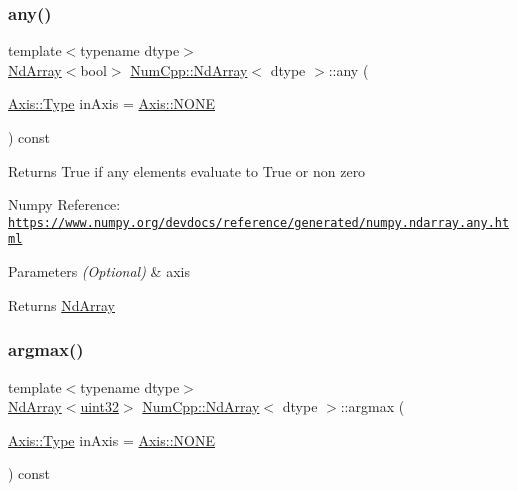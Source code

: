 \subsubsection{\texorpdfstring{any()}{any()}}
{\footnotesize\ttfamily template$<$typename dtype$>$ \\
\mbox{\hyperlink{class_num_cpp_1_1_nd_array}{Nd\+Array}}$<$bool$>$ \mbox{\hyperlink{class_num_cpp_1_1_nd_array}{Num\+Cpp\+::\+Nd\+Array}}$<$ dtype $>$\+::any (\begin{DoxyParamCaption}\item[{\mbox{\hyperlink{struct_num_cpp_1_1_axis_ac10eb76f8631762d9ed70c40c42ca6cb}{Axis\+::\+Type}}}]{in\+Axis = {\ttfamily \mbox{\hyperlink{struct_num_cpp_1_1_axis_ac10eb76f8631762d9ed70c40c42ca6cba747ae657022cca1d87702b56d0c038e9}{Axis\+::\+N\+O\+NE}}} }\end{DoxyParamCaption}) const\hspace{0.3cm}{\ttfamily [inline]}}

Returns True if any elements evaluate to True or non zero

Numpy Reference\+: \href{https://www.numpy.org/devdocs/reference/generated/numpy.ndarray.any.html}{\tt https\+://www.\+numpy.\+org/devdocs/reference/generated/numpy.\+ndarray.\+any.\+html}


\begin{DoxyParams}{Parameters}
{\em (\+Optional)} & axis \\
\hline
\end{DoxyParams}
\begin{DoxyReturn}{Returns}
\mbox{\hyperlink{class_num_cpp_1_1_nd_array}{Nd\+Array}} 
\end{DoxyReturn}
\mbox{\label{class_num_cpp_1_1_nd_array_a4ca45b620311bdfe348d6cf9f3c71415}} 
\subsubsection{\texorpdfstring{argmax()}{argmax()}}
{\footnotesize\ttfamily template$<$typename dtype$>$ \\
\mbox{\hyperlink{class_num_cpp_1_1_nd_array}{Nd\+Array}}$<$\mbox{\hyperlink{namespace_num_cpp_a36f388e948380413c63011cab9b7fbd5}{uint32}}$>$ \mbox{\hyperlink{class_num_cpp_1_1_nd_array}{Num\+Cpp\+::\+Nd\+Array}}$<$ dtype $>$\+::argmax (\begin{DoxyParamCaption}\item[{\mbox{\hyperlink{struct_num_cpp_1_1_axis_ac10eb76f8631762d9ed70c40c42ca6cb}{Axis\+::\+Type}}}]{in\+Axis = {\ttfamily \mbox{\hyperlink{struct_num_cpp_1_1_axis_ac10eb76f8631762d9ed70c40c42ca6cba747ae657022cca1d87702b56d0c038e9}{Axis\+::\+N\+O\+NE}}} }\end{DoxyParamCaption}) const\hspace{0.3cm}{\ttfamily [inline]}}

